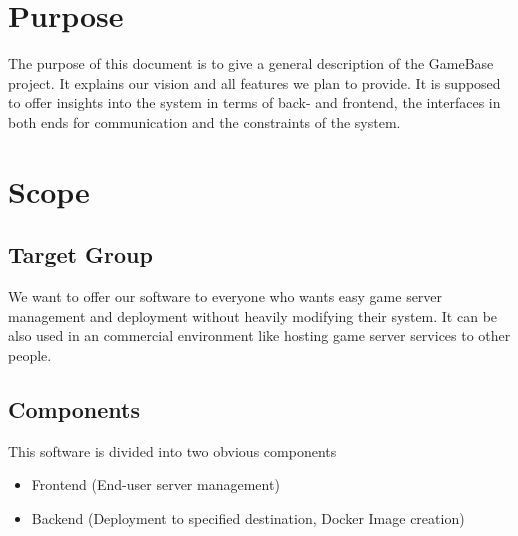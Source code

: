 \documentclass[a4paper,12pt,chapterprefix=false,bibliography=totoc,listof=totoc,]{scrreprt}
\begin{document}
\section{Purpose}
The purpose of this document is to give a general description of the GameBase project. It explains our vision and all features we plan to provide. It is supposed to offer insights into the system in terms of back- and frontend, the interfaces in both ends for communication and the constraints of the system.

\section{Scope}
\subsection*{Target Group}
We want to offer our software to everyone who wants easy game server management and deployment without heavily modifying their system. It can be also used in an commercial environment like hosting game server services to other people.

\subsection*{Components}
This software is divided into two obvious components
\begin{itemize}
	\item Frontend (End-user server management)
	\item Backend (Deployment to specified destination, Docker Image creation)
\end{itemize}
\end{document}
